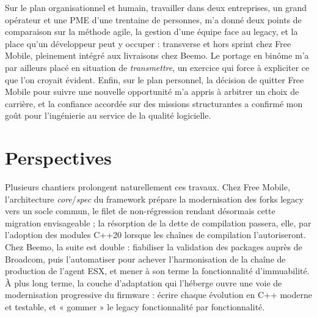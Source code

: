 Sur le plan organisationnel et humain, travailler dans deux entreprises,
un grand opérateur et une PME d'une trentaine de personnes, m'a donné deux
points de comparaison sur la méthode agile, la gestion d'une équipe face au
legacy, et la place qu'un développeur peut y occuper : transverse et hors
sprint chez Free Mobile, pleinement intégré aux livraisons chez Beemo. Le
portage en binôme m'a par ailleurs placé en situation de \emph{transmettre},
un exercice qui force à expliciter ce que l'on croyait évident. Enfin, sur le
plan personnel, la décision de quitter Free Mobile pour suivre une nouvelle
opportunité m'a appris à arbitrer un choix de carrière, et la confiance
accordée sur des missions structurantes a confirmé mon goût pour
l'ingénierie au service de la qualité logicielle.

\section{Perspectives}
Plusieurs chantiers prolongent naturellement ces travaux. Chez Free Mobile,
l'architecture \emph{core}/\emph{spec} du framework prépare la modernisation
des forks legacy vers un socle commun, le filet de non-régression rendant
désormais cette migration envisageable ; la résorption de la dette de
compilation passera, elle, par l'adoption des modules C++20 lorsque les
chaînes de compilation l'autoriseront. Chez Beemo, la suite est double :
fiabiliser la validation des packages auprès de Broadcom, puis l'automatiser
pour achever l'harmonisation de la chaîne de production de l'agent ESX, et
mener à son terme la fonctionnalité d'immuabilité. À plus long terme, la
couche d'adaptation qui l'héberge ouvre une voie de modernisation progressive
du firmware : écrire chaque évolution en C++ moderne et testable, et « gommer »
le legacy fonctionnalité par fonctionnalité.
